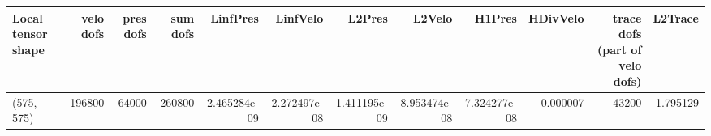 \begin{tabular}{lrrrrrrrrrrr}
\toprule
Local tensor shape &  velo dofs &  pres dofs &  sum dofs &     LinfPres &     LinfVelo &       L2Pres &       L2Velo &       H1Pres &  HDivVelo &  trace dofs (part of velo dofs) &  L2Trace \\
\midrule
        (575, 575) &     196800 &      64000 &    260800 & 2.465284e-09 & 2.272497e-08 & 1.411195e-09 & 8.953474e-08 & 7.324277e-08 &  0.000007 &                           43200 & 1.795129 \\
\bottomrule
\end{tabular}
